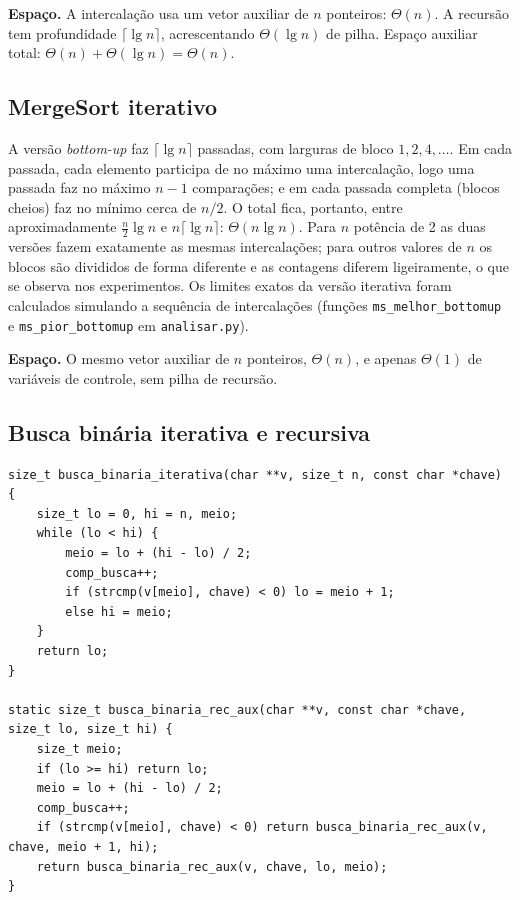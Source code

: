 \documentclass[11pt,a4paper]{article}
\begin{document}
\textbf{Espaço.} A intercalação usa um vetor auxiliar de $n$ ponteiros: $\Theta(n)$. A recursão tem profundidade $\lceil\lg n\rceil$, acrescentando $\Theta(\lg n)$ de pilha. Espaço auxiliar total: $\Theta(n)+\Theta(\lg n)=\Theta(n)$.

\subsection{MergeSort iterativo}

A versão \emph{bottom-up} faz $\lceil\lg n\rceil$ passadas, com larguras de bloco $1,2,4,\ldots$. Em cada passada, cada elemento participa de no máximo uma intercalação, logo uma passada faz no máximo $n-1$ comparações; e em cada passada completa (blocos cheios) faz no mínimo cerca de $n/2$. O total fica, portanto, entre aproximadamente $\frac n2\lg n$ e $n\lceil\lg n\rceil$: $\Theta(n\lg n)$. Para $n$ potência de 2 as duas versões fazem exatamente as mesmas intercalações; para outros valores de $n$ os blocos são divididos de forma diferente e as contagens diferem ligeiramente, o que se observa nos experimentos. Os limites exatos da versão iterativa foram calculados simulando a sequência de intercalações (funções \texttt{ms\_melhor\_bottomup} e \texttt{ms\_pior\_bottomup} em \texttt{analisar.py}).

\textbf{Espaço.} O mesmo vetor auxiliar de $n$ ponteiros, $\Theta(n)$, e apenas $\Theta(1)$ de variáveis de controle, sem pilha de recursão.

\subsection{Busca binária iterativa e recursiva}

\begin{lstlisting}[caption={Busca binária iterativa e recursiva (limite inferior)}]
size_t busca_binaria_iterativa(char **v, size_t n, const char *chave) {
    size_t lo = 0, hi = n, meio;
    while (lo < hi) {
        meio = lo + (hi - lo) / 2;
        comp_busca++;
        if (strcmp(v[meio], chave) < 0) lo = meio + 1;
        else hi = meio;
    }
    return lo;
}

static size_t busca_binaria_rec_aux(char **v, const char *chave, size_t lo, size_t hi) {
    size_t meio;
    if (lo >= hi) return lo;
    meio = lo + (hi - lo) / 2;
    comp_busca++;
    if (strcmp(v[meio], chave) < 0) return busca_binaria_rec_aux(v, chave, meio + 1, hi);
    return busca_binaria_rec_aux(v, chave, lo, meio);
}
\end{lstlisting}
\end{document}
